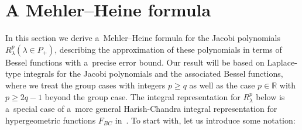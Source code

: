 \section{A Mehler--Heine formula}\label{Section2}

In this section we derive a~Mehler--Heine formula for the Jacobi polynomials $R_\lambda^p (\lambda \in P_+)$, describing
the approximation of these polynomials in terms of Bessel functions with a~precise error bound.
Our result will be based on Laplace-type integrals for the Jacobi polynomials and the associated Bessel functions, where
we treat the group cases with integers $p\ge q$ as well as the case $p\in\mathbb R$ with $p\ge 2q-1$ beyond the group
case.
The integral representation for $R_{\lambda}^p$ below is a~special case of a~more general Harish-Chandra integral
representation for hypergeometric functions $F_{BC}$ in~\cite{RV2}.
To start with, let us introduce some notation:

